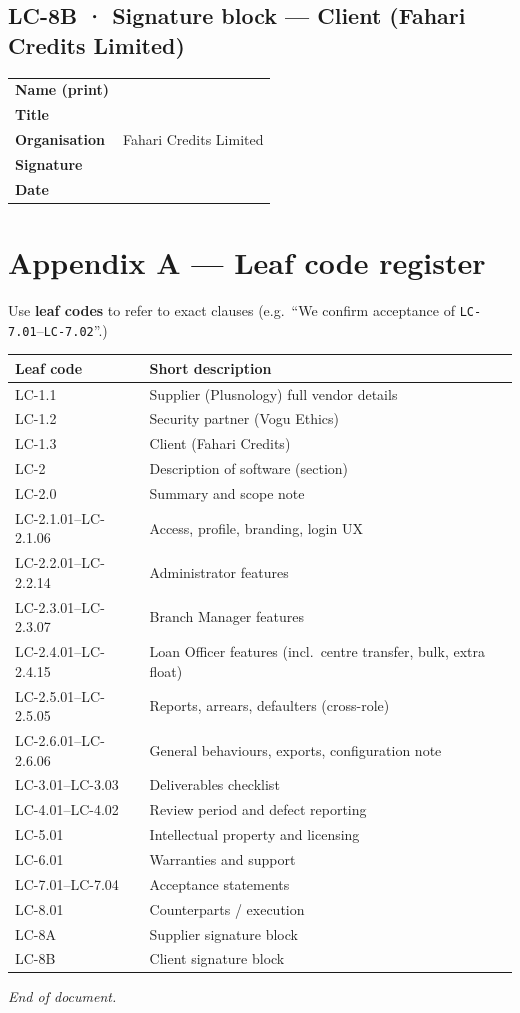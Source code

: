 \documentclass[11pt,a4paper]{article}
\begin{document}
\subsection*{LC-8B · Signature block --- Client (Fahari Credits Limited)}

\begin{tabular}{@{}p{4cm}p{9cm}@{}}
\toprule
\textbf{Name (print)} & \rule{0pt}{2.2em}\hrulefill \\
\textbf{Title} & \rule{0pt}{2.2em}\hrulefill \\
\textbf{Organisation} & Fahari Credits Limited \\
\textbf{Signature} & \rule{0pt}{2.2em}\hrulefill \\
\textbf{Date} & \rule{0pt}{2.2em}\hrulefill \\
\bottomrule
\end{tabular}

\section*{Appendix A --- Leaf code register}

Use \textbf{leaf codes} to refer to exact clauses (e.g.\ ``We confirm acceptance of \texttt{LC-7.01}--\texttt{LC-7.02}''.)

\begin{tabular}{@{}p{4.2cm}p{9.2cm}@{}}
\toprule
\textbf{Leaf code} & \textbf{Short description} \\
\midrule
LC-1.1 & Supplier (Plusnology) full vendor details \\
LC-1.2 & Security partner (Vogu Ethics) \\
LC-1.3 & Client (Fahari Credits) \\
LC-2 & Description of software (section) \\
LC-2.0 & Summary and scope note \\
LC-2.1.01--LC-2.1.06 & Access, profile, branding, login UX \\
LC-2.2.01--LC-2.2.14 & Administrator features \\
LC-2.3.01--LC-2.3.07 & Branch Manager features \\
LC-2.4.01--LC-2.4.15 & Loan Officer features (incl.\ centre transfer, bulk, extra float) \\
LC-2.5.01--LC-2.5.05 & Reports, arrears, defaulters (cross-role) \\
LC-2.6.01--LC-2.6.06 & General behaviours, exports, configuration note \\
LC-3.01--LC-3.03 & Deliverables checklist \\
LC-4.01--LC-4.02 & Review period and defect reporting \\
LC-5.01 & Intellectual property and licensing \\
LC-6.01 & Warranties and support \\
LC-7.01--LC-7.04 & Acceptance statements \\
LC-8.01 & Counterparts / execution \\
LC-8A & Supplier signature block \\
LC-8B & Client signature block \\
\bottomrule
\end{tabular}

\vspace{1em}
\begin{center}
\textit{End of document.}
\end{center}
\end{document}
